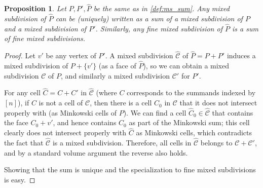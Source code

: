 \documentclass[10pt,a4paper]{amsart}
\newtheorem{proposition}{Proposition}
\begin{document}
\begin{proposition}\label{prop:ms_decomp}
    Let $P, P', \hat{P}$ be the same as in \cref{def:ms_sum}. Any mixed subdivision of $\hat{P}$ can be (uniquely) written as a sum of a mixed subdivision of $P$ and a mixed subdivision of $P'$. Similarly, any fine mixed subdivision of $\hat{P}$ is a sum of fine mixed subdivisions.
\end{proposition}

\begin{proof}
    Let $v'$ be any vertex of $P'$. A mixed subdivision $\hat{\mathcal{C}}$ of $\hat{P} = P + P'$ induces a mixed subdivision of $P + \{v'\}$ (as a face of $\hat{P}$), so we can obtain a mixed subdivision $\mathcal{C}$ of $P$, and similarly a mixed subdivision $\mathcal{C}'$ for $P'$. 
    
    For any cell $\hat{C} = C + C'$ in $\hat{\mathcal{C}}$ (where $C$ corresponds to the summands indexed by $[n]$), if $C$ is not a cell of $\mathcal{C}$, then there is a cell $C_0$ in $\mathcal{C}$ that it does not intersect properly with (as Minkowski cells of $P$). We can find a cell $\hat{C}_0 \in \hat{\mathcal{C}}$ that contains the face $C_0 + v'$, and hence contains $C_0$ as part of the Minkowski sum; this cell clearly does not intersect properly with $\hat{C}$ as Minkowski cells, which contradicts the fact that $\hat{\mathcal{C}}$ is a mixed subdivision. Therefore, all cells in $\hat{\mathcal{C}}$ belongs to $\mathcal{C} + \mathcal{C}'$, and by a standard volume argument the reverse also holds.

    Showing that the sum is unique and the specialization to fine mixed subdivisions is easy.
\end{proof}
\end{document}
